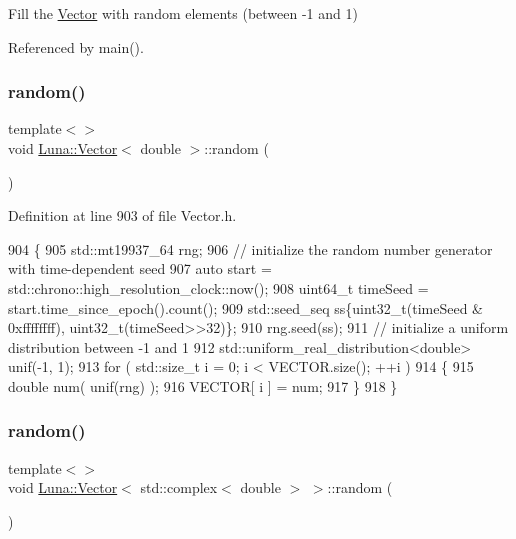 Fill the \hyperlink{classLuna_1_1Vector}{Vector} with random elements (between -\/1 and 1) 



Referenced by main().

\mbox{\label{classLuna_1_1Vector_a0a853cbc32fbc152c90b08f37aa14a10}} 
\subsubsection{\texorpdfstring{random()}{random()}\hspace{0.1cm}{\footnotesize\ttfamily [2/3]}}
{\footnotesize\ttfamily template$<$$>$ \\
void \hyperlink{classLuna_1_1Vector}{Luna\+::\+Vector}$<$ double $>$\+::random (\begin{DoxyParamCaption}{ }\end{DoxyParamCaption})\hspace{0.3cm}{\ttfamily [inline]}}



Definition at line 903 of file Vector.\+h.


\begin{DoxyCode}
904   \{
905     std::mt19937\_64 rng;
906     \textcolor{comment}{// initialize the random number generator with time-dependent seed}
907     \textcolor{keyword}{auto} start = std::chrono::high\_resolution\_clock::now();
908     uint64\_t timeSeed = start.time\_since\_epoch().count();
909     std::seed\_seq ss\{uint32\_t(timeSeed & 0xffffffff), uint32\_t(timeSeed>>32)\};
910     rng.seed(ss);
911     \textcolor{comment}{// initialize a uniform distribution between -1 and 1}
912     std::uniform\_real\_distribution<double> unif(-1, 1);
913     \textcolor{keywordflow}{for} ( std::size\_t i = 0; i < VECTOR.size(); ++i )
914     \{
915       \textcolor{keywordtype}{double} num( unif(rng) );
916       VECTOR[ i ] = num;
917     \}
918   \}
\end{DoxyCode}
\mbox{\label{classLuna_1_1Vector_ada5c7a79b4011f3cae60ae198a6c240a}} 
\subsubsection{\texorpdfstring{random()}{random()}\hspace{0.1cm}{\footnotesize\ttfamily [3/3]}}
{\footnotesize\ttfamily template$<$$>$ \\
void \hyperlink{classLuna_1_1Vector}{Luna\+::\+Vector}$<$ std\+::complex$<$ double $>$ $>$\+::random (\begin{DoxyParamCaption}{ }\end{DoxyParamCaption})\hspace{0.3cm}{\ttfamily [inline]}}



